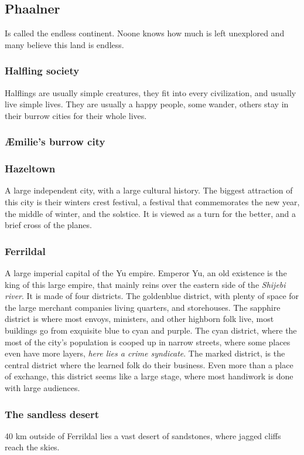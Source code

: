 \documentclass[a4paper]{article}
\begin{document}
\subsection{Phaalner}
Is called the endless continent. Noone knows how much is left unexplored and many believe this land is endless.

\subsubsection{Halfling society}
Halflings are usually simple creatures, they fit into every civilization, and usually live simple lives. They are usually a happy people, some wander, others stay in their burrow cities for their whole lives. 

\subsubsection{Æmilie's burrow city}

\subsubsection{Hazeltown}
A large independent city, with a large cultural history. The biggest attraction of this city is their winters crest festival, a festival that commemorates the new year, the middle of winter, and the solstice. It is viewed as a turn for the better, and a brief cross of the planes.

\subsubsection{Ferrildal}
A large imperial capital of the Yu empire. Emperor Yu, an old existence is the king of this large empire, that mainly reins over the eastern side of the \textit{Shijebi river}. It is made of four districts. The goldenblue district, with plenty of space for the large merchant companies living quarters, and storehouses. The sapphire district is where most envoys, ministers, and other highborn folk live, most buildings go from exquisite blue to cyan and purple. The cyan district, where the most of the city's population is cooped up in narrow streets, where some places even have more layers, \textit{here lies a crime syndicate}. The marked district, is the central district where the learned folk do their business. Even more than a place of exchange, this district seems like a large stage, where most handiwork is done with large audiences.

\subsubsection{The sandless desert}
40 km outside of Ferrildal lies a vast desert of sandstones, where jagged cliffs reach the skies.
\end{document}
